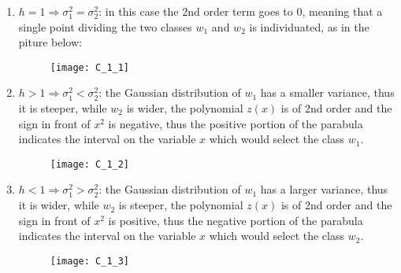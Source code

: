 \begin{enumerate}
    \item \(h=1\Rightarrow\sigma_1^2=\sigma_2^2\): in this case the 2nd order term
    goes to 0, meaning that a single point dividing the two classes \(w_1\) and \(w_2\)
    is individuated, as in the piture below:
    \begin{figure}[H]
        \texttt{[image: C\_1\_1]}
        \centering
    \end{figure}
    \item \(h>1\Rightarrow\sigma_1^2<\sigma_2^2\): the Gaussian distribution of \(w_1\)
    has a smaller variance, thus it is steeper, while \(w_2\) is wider, the polynomial \(z(x)\)
    is of 2nd order and the sign in front of \(x^2\) is negative, thus the
    positive portion of the parabula indicates the interval on the variable \(x\)
    which would select the class \(w_1\).
    \begin{figure}[H]
        \texttt{[image: C\_1\_2]}
        \centering
    \end{figure}
    \item \(h<1\Rightarrow\sigma_1^2>\sigma_2^2\): the Gaussian distribution of \(w_1\)
    has a larger variance, thus it is wider, while \(w_2\) is steeper, the polynomial \(z(x)\)
    is of 2nd order and the sign in front of \(x^2\) is positive, thus the
    negative portion of the parabula indicates the interval on the variable \(x\)
    which would select the class \(w_2\).
    \begin{figure}[H]
        \texttt{[image: C\_1\_3]}
        \centering
    \end{figure}
  \end{enumerate}